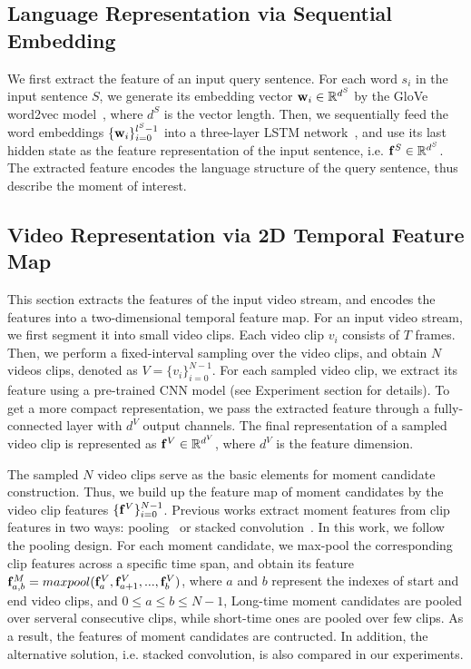 \documentclass[letterpaper]{article} %
\begin{document}
\subsection{Language Representation via Sequential Embedding}

We first extract the feature of an input query sentence. For each word $s_i$ in the input sentence $S$, we generate its embedding vector ${\bf{w}}_i \in \mathbb{R}^{d^S}$ by the GloVe word2vec model~\cite{pennington2014glove}, where $d^S$ is the vector length. Then, we sequentially feed the word embeddings $\{ {\bf{w}}_i \}_{i=0}^{l^S-1}$ into a three-layer LSTM network~\cite{hochreiter1997long}, and use its last hidden state as the feature representation of the input sentence, i.e. ${\bf{f}}^S\in \mathbb{R}^{d^{S}}$. The extracted feature encodes the language structure of the query sentence, thus describe the moment of interest.


\subsection{Video Representation via 2D Temporal Feature Map}
This section extracts the features of the input video stream, and encodes the features into a two-dimensional temporal feature map.
For an input video stream, we first segment it into small video clips.
Each video clip $v_i$ consists of $T$ frames.
Then, we perform a fixed-interval sampling over the video clips, and obtain $N$ videos clips, denoted as $V=\{v_i\}_{i=0}^{N-1}$.
For each sampled video clip, we extract its feature using a pre-trained CNN model (see Experiment section for details). To get a more compact representation, we pass the extracted feature through a fully-connected layer with $d^V$ output channels. The final representation of a sampled video clip is represented as ${\bf{f}}^V \in {\mathbb{R}}^{d^V}$, where $d^V$ is the feature dimension.

The sampled $N$ video clips serve as the basic elements for moment candidate construction. Thus, we build up the feature map of moment candidates by the video clip features $ {{\{{\bf{f}}^V}\}_{i=0}^{N-1}}$.
Previous works extract moment features from clip features in two ways: pooling~\cite{hendricks17iccv} or stacked convolution~\cite{zhang2019man}.
In this work, we follow the pooling design. For each moment candidate, we max-pool the corresponding clip features across a specific time span, and obtain its feature  ${{\bf{f}}_{a,b}^M}=maxpool({{\bf{f}}_a^V}, {{\bf{f}}_{a+1}^V}, ..., {{\bf{f}}_b^V})$, where $a$ and $b$ represent the indexes of start and end video clips, and $0 \le a \le b \le N-1$,
Long-time moment candidates are pooled over serveral consecutive clips, while short-time ones are pooled over few clips. As a result, the features of moment candidates are contructed.
In addition, the alternative solution, i.e. stacked convolution, is also compared in our experiments.
\end{document}
